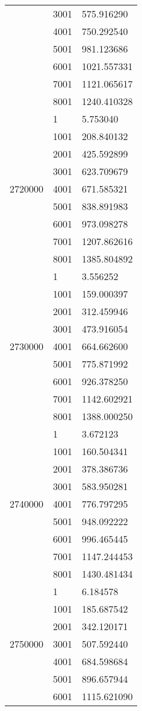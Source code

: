 \begin{table}[htb!]
\begin{tabular}{lll}
 & 3001 & 575.916290 \\
 & 4001 & 750.292540 \\
 & 5001 & 981.123686 \\
 & 6001 & 1021.557331 \\
 & 7001 & 1121.065617 \\
 & 8001 & 1240.410328 \\
\multirow[c]{9}{*}{2720000} & 1 & 5.753040 \\
 & 1001 & 208.840132 \\
 & 2001 & 425.592899 \\
 & 3001 & 623.709679 \\
 & 4001 & 671.585321 \\
 & 5001 & 838.891983 \\
 & 6001 & 973.098278 \\
 & 7001 & 1207.862616 \\
 & 8001 & 1385.804892 \\
\multirow[c]{9}{*}{2730000} & 1 & 3.556252 \\
 & 1001 & 159.000397 \\
 & 2001 & 312.459946 \\
 & 3001 & 473.916054 \\
 & 4001 & 664.662600 \\
 & 5001 & 775.871992 \\
 & 6001 & 926.378250 \\
 & 7001 & 1142.602921 \\
 & 8001 & 1388.000250 \\
\multirow[c]{9}{*}{2740000} & 1 & 3.672123 \\
 & 1001 & 160.504341 \\
 & 2001 & 378.386736 \\
 & 3001 & 583.950281 \\
 & 4001 & 776.797295 \\
 & 5001 & 948.092222 \\
 & 6001 & 996.465445 \\
 & 7001 & 1147.244453 \\
 & 8001 & 1430.481434 \\
\multirow[c]{9}{*}{2750000} & 1 & 6.184578 \\
 & 1001 & 185.687542 \\
 & 2001 & 342.120171 \\
 & 3001 & 507.592440 \\
 & 4001 & 684.598684 \\
 & 5001 & 896.657944 \\
 & 6001 & 1115.621090 \\

\end{tabular}
\end{table}
